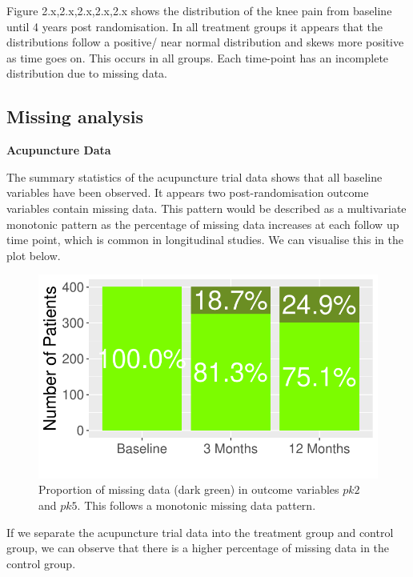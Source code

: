 \documentclass{article}
\newcommand{\pandocbounded}[1]{#1}
\begin{document}
Figure 2.x,2.x,2.x,2.x,2.x shows the distribution of the knee pain from
baseline until 4 years post randomisation. In all treatment groups it
appears that the distributions follow a positive/ near normal
distribution and skews more positive as time goes on. This occurs in all
groups. Each time-point has an incomplete distribution due to missing
data.

\newpage

\subsection{Missing analysis}\label{missing-analysis}

\textbf{Acupuncture Data}

The summary statistics of the acupuncture trial data shows that all
baseline variables have been observed. It appears two post-randomisation
outcome variables contain missing data. This pattern would be described
as a multivariate monotonic pattern as the percentage of missing data
increases at each follow up time point, which is common in longitudinal
studies. We can visualise this in the plot below.

\begin{figure}
\centering
\pandocbounded{\includegraphics[keepaspectratio]{Final_Report_files/figure-latex/unnamed-chunk-24-1.pdf}}
\caption{Proportion of missing data (dark green) in outcome variables
\(pk2\) and \(pk5\). This follows a monotonic missing data pattern.}
\end{figure}

If we separate the acupuncture trial data into the treatment group and
control group, we can observe that there is a higher percentage of
missing data in the control group.
\end{document}
